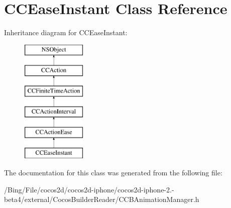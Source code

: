 \hypertarget{interface_c_c_ease_instant}{\section{C\-C\-Ease\-Instant Class Reference}
\label{interface_c_c_ease_instant}
}
Inheritance diagram for C\-C\-Ease\-Instant\-:\begin{figure}[H]
\begin{center}
\leavevmode
\includegraphics[height=6.000000cm]{interface_c_c_ease_instant}
\end{center}
\end{figure}


The documentation for this class was generated from the following file\-:\begin{DoxyCompactItemize}
\item 
/\-Bing/\-File/cocos2d/cocos2d-\/iphone/cocos2d-\/iphone-\/2.-\/beta4/external/\-Cocos\-Builder\-Reader/C\-C\-B\-Animation\-Manager.\-h\end{DoxyCompactItemize}
